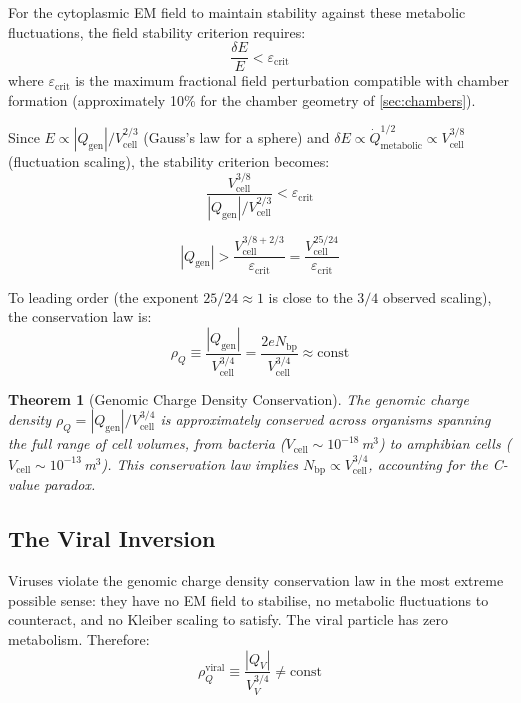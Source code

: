 \documentclass[11pt,twocolumn,a4paper]{article}
\newtheorem{theorem}{Theorem}[section]
\theoremstyle{definition}
\theoremstyle{remark}
\newcommand{\Qgen}{Q_{\mathrm{gen}}}
\newcommand{\eps}{\varepsilon}
\newcommand{\abs}[1]{\left|#1\right|}
\begin{document}
For the cytoplasmic EM field to maintain stability against these metabolic fluctuations, the field stability criterion requires:
\begin{equation}
  \frac{\delta E}{E} < \eps_{\mathrm{crit}}
\end{equation}
where $\eps_{\mathrm{crit}}$ is the maximum fractional field perturbation compatible with chamber formation (approximately 10\% for the chamber geometry of \cref{sec:chambers}).

Since $E \propto \abs{\Qgen} / V_{\mathrm{cell}}^{2/3}$ (Gauss's law for a sphere) and $\delta E \propto \dot{Q}_{\mathrm{metabolic}}^{1/2} \propto V_{\mathrm{cell}}^{3/8}$ (fluctuation scaling), the stability criterion becomes:
\begin{equation}
  \frac{V_{\mathrm{cell}}^{3/8}}{\abs{\Qgen} / V_{\mathrm{cell}}^{2/3}} < \eps_{\mathrm{crit}}
\end{equation}

\begin{equation}
  \abs{\Qgen} > \frac{V_{\mathrm{cell}}^{3/8 + 2/3}}{\eps_{\mathrm{crit}}} = \frac{V_{\mathrm{cell}}^{25/24}}{\eps_{\mathrm{crit}}}
\end{equation}

To leading order (the exponent $25/24 \approx 1$ is close to the $3/4$ observed scaling), the conservation law is:
\begin{equation}
  \rho_Q \equiv \frac{\abs{\Qgen}}{V_{\mathrm{cell}}^{3/4}} = \frac{2e N_{\mathrm{bp}}}{V_{\mathrm{cell}}^{3/4}} \approx \mathrm{const}
  \label{eq:rhoQ_conservation}
\end{equation}

\begin{theorem}[Genomic Charge Density Conservation]
\label{thm:cvalue}
The genomic charge density $\rho_Q = \abs{\Qgen} / V_{\mathrm{cell}}^{3/4}$ is approximately conserved across organisms spanning the full range of cell volumes, from bacteria ($V_{\mathrm{cell}} \sim 10^{-18}$\,m$^3$) to amphibian cells ($V_{\mathrm{cell}} \sim 10^{-13}$\,m$^3$). This conservation law implies $N_{\mathrm{bp}} \propto V_{\mathrm{cell}}^{3/4}$, accounting for the C-value paradox.
\end{theorem}

\subsection{The Viral Inversion}

Viruses violate the genomic charge density conservation law in the most extreme possible sense: they have no EM field to stabilise, no metabolic fluctuations to counteract, and no Kleiber scaling to satisfy. The viral particle has zero metabolism. Therefore:
\begin{equation}
  \rho_Q^{\mathrm{viral}} \equiv \frac{\abs{Q_V}}{V_V^{3/4}} \neq \mathrm{const}
\end{equation}
\end{document}
